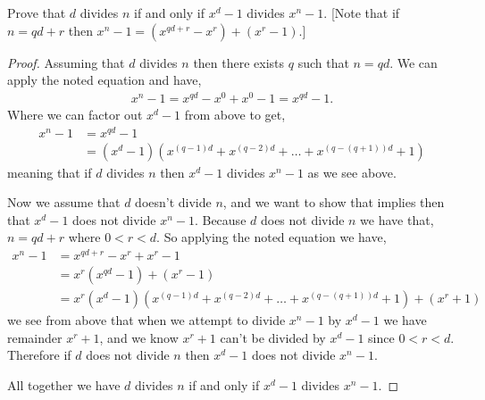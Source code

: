 \documentclass[11pt]{article}
\newenvironment{problem}[2][Problem\!]{\begin{trivlist}
\item[\hskip \labelsep {\bfseries #1}\hskip \labelsep {\bfseries #2}]}{\end{trivlist}}
\begin{document}
\vspace*{20pt}
\begin{tcolorbox}
    \begin{problem}{13.5.3}
        Prove that $d$ divides $n$ if and only if $x^{d} -1$ divides $x^{n} -1$. [Note that if $n = qd + r$ then $x^{n} -1 = (x^{qd + r} - x^{r}) + (x^{r} -1 ).$]
    \end{problem}
\end{tcolorbox}
\begin{proof}
    Assuming that $d$ divides $n$ then there exists $q$ such that $n = qd$. We can apply the noted equation and have,
    \begin{align*}
        x^{n} -1 = x^{qd} - x^{0} + x^{0} - 1 = x^{qd} - 1.
    \end{align*} 
    Where we can factor out $x^{d} - 1$ from above to get,
    \begin{align*}
        x^{n} -1 &= x^{qd} -1 \\
        &= (x^{d} -1)(x^{(q-1)d} + x^{(q-2)d} + \dots + x^{(q - (q+1))d} + 1)
    \end{align*}
    meaning that if $d$ divides $n$ then $x^{d} -1$ divides $x^{n} -1$ as we see above. 

    Now we assume that $d$ doesn't divide $n$, and we want to show that implies then that $x^{d}-1$ does not divide $x^{n} - 1$. Because $d$ does not divide $n$ we have that, $n = qd + r$ where $0 < r < d$. So applying the noted equation we have,
    \begin{align*}
        x^{n}-1 &= x^{qd + r} - x^{r} + x^{r} -1 \\
        &= x^{r}(x^{qd} - 1) +(x^{r}-1) \\
        &= x^{r}(x^{d}-1)(x^{(q-1)d} + x^{(q-2)d} + \dots + x^{(q - (q + 1))d} + 1) + (x^{r} + 1)
    \end{align*}
    we see from above that when we attempt to divide $x^{n} -1$ by $x^{d}-1$ we have remainder $x^{r} + 1$, and we know $x^{r}+1$ can't be divided by $x^{d}-1$ since $ 0 <  r < d $. Therefore if $d$ does not divide $n$ then $x^{d} - 1$ does not divide $x^{n} -1$. 

    All together we have $d$ divides $n $ if and only if $x^{d} -1 $ divides $x^{n} -1 $.
\end{proof}
\end{document}
